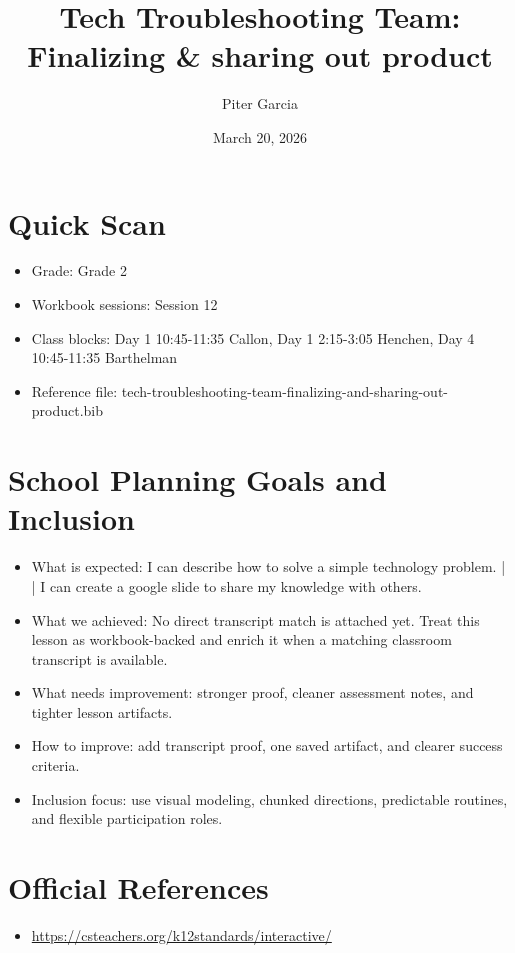 \documentclass[11pt]{article}
\title{Tech Troubleshooting Team: Finalizing & sharing out product}
\author{Piter Garcia}
\date{March 20, 2026}
\begin{document}
\maketitle
\section*{Quick Scan}
\begin{itemize}[leftmargin=*]
\item Grade: Grade 2
\item Workbook sessions: Session 12
\item Class blocks: Day 1 10:45-11:35 Callon, Day 1 2:15-3:05 Henchen, Day 4 10:45-11:35 Barthelman
\item Reference file: tech-troubleshooting-team-finalizing-and-sharing-out-product.bib
\end{itemize}
\section*{School Planning Goals and Inclusion}
\begin{itemize}[leftmargin=*]
\item What is expected: I can describe how to solve a simple technology problem. | | I can create a google slide to share my knowledge with others.
\item What we achieved: No direct transcript match is attached yet. Treat this lesson as workbook-backed and enrich it when a matching classroom transcript is available.
\item What needs improvement: stronger proof, cleaner assessment notes, and tighter lesson artifacts.
\item How to improve: add transcript proof, one saved artifact, and clearer success criteria.
\item Inclusion focus: use visual modeling, chunked directions, predictable routines, and flexible participation roles.
\end{itemize}
\section*{Official References}
\begin{itemize}[leftmargin=*]
\item \url{https://csteachers.org/k12standards/interactive/}

\end{itemize}
\end{document}
